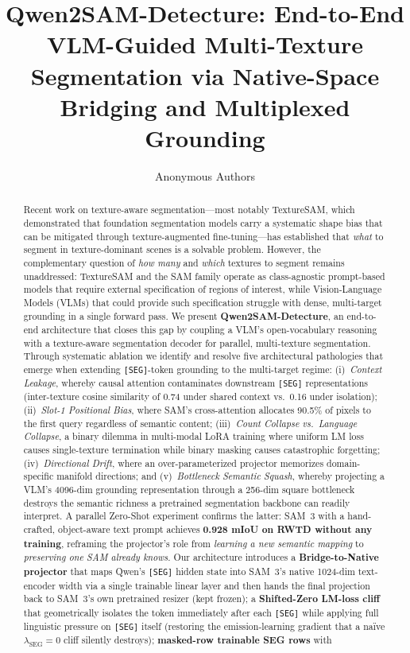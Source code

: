 \documentclass{article}
\title{Qwen2SAM-Detecture: End-to-End VLM-Guided Multi-Texture Segmentation via Native-Space Bridging and Multiplexed Grounding}
\author{%
  Anonymous Authors
}
\begin{document}
\maketitle

\begin{abstract}
Recent work on texture-aware segmentation---most notably TextureSAM, which demonstrated that foundation segmentation models carry a systematic shape bias that can be mitigated through texture-augmented fine-tuning---has established that \emph{what} to segment in texture-dominant scenes is a solvable problem. However, the complementary question of \emph{how many} and \emph{which} textures to segment remains unaddressed: TextureSAM and the SAM family operate as class-agnostic prompt-based models that require external specification of regions of interest, while Vision-Language Models (VLMs) that could provide such specification struggle with dense, multi-target grounding in a single forward pass. We present \textbf{Qwen2SAM-Detecture}, an end-to-end architecture that closes this gap by coupling a VLM's open-vocabulary reasoning with a texture-aware segmentation decoder for parallel, multi-texture segmentation. Through systematic ablation we identify and resolve five architectural pathologies that emerge when extending \texttt{[SEG]}-token grounding to the multi-target regime: (i)~\emph{Context Leakage}, whereby causal attention contaminates downstream \texttt{[SEG]} representations (inter-texture cosine similarity of 0.74 under shared context vs.\ 0.16 under isolation); (ii)~\emph{Slot-1 Positional Bias}, where SAM's cross-attention allocates 90.5\% of pixels to the first query regardless of semantic content; (iii)~\emph{Count Collapse vs.\ Language Collapse}, a binary dilemma in multi-modal LoRA training where uniform LM loss causes single-texture termination while binary masking causes catastrophic forgetting; (iv)~\emph{Directional Drift}, where an over-parameterized projector memorizes domain-specific manifold directions; and (v)~\emph{Bottleneck Semantic Squash}, whereby projecting a VLM's 4096-dim grounding representation through a 256-dim square bottleneck destroys the semantic richness a pretrained segmentation backbone can readily interpret. A parallel Zero-Shot experiment confirms the latter: SAM~3 with a hand-crafted, object-aware text prompt achieves \textbf{0.928 mIoU on RWTD without any training}, reframing the projector's role from \emph{learning a new semantic mapping} to \emph{preserving one SAM already knows}. Our architecture introduces a \textbf{Bridge-to-Native projector} that maps Qwen's \texttt{[SEG]} hidden state into SAM~3's native 1024-dim text-encoder width via a single trainable linear layer and then hands the final projection back to SAM~3's own pretrained resizer (kept frozen); a \textbf{Shifted-Zero LM-loss cliff} that geometrically isolates the token immediately after each \texttt{[SEG]} while applying full linguistic pressure on \texttt{[SEG]} itself (restoring the emission-learning gradient that a na\"ive $\lambda_{\text{SEG}} = 0$ cliff silently destroys); \textbf{masked-row trainable SEG rows} with 
\end{abstract}
\end{document}
